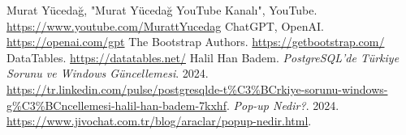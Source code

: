 \documentclass[12pt, a4paper]{article}
\begin{document}
\newpage
\begin{thebibliography}{9}
	 Murat Yücedağ, "Murat Yücedağ YouTube Kanalı", YouTube. \url{https://www.youtube.com/MurattYucedag}
	 ChatGPT, OpenAI. \url{https://openai.com/gpt}
	 The Bootstrap Authors. \url{https://getbootstrap.com/}
	 DataTables. \url{https://datatables.net/}
	 Halil Han Badem. \textit{PostgreSQL'de Türkiye Sorunu ve Windows Güncellemesi}. 2024. \url{https://tr.linkedin.com/pulse/postgresqlde-t%C3%BCrkiye-sorunu-windows-g%C3%BCncellemesi-halil-han-badem-7kxhf}. 
	  \textit{Pop-up Nedir?}. 2024. \url{https://www.jivochat.com.tr/blog/araclar/popup-nedir.html}.
		
\end{thebibliography}
\newpage
	
\end{document}

